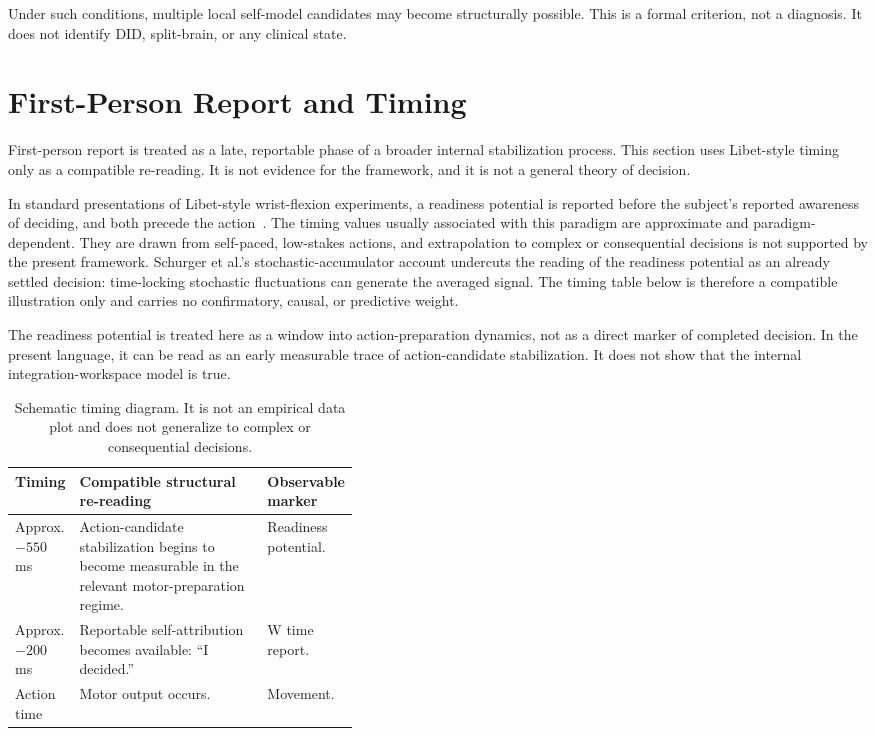\documentclass[12pt]{article}
\theoremstyle{definition}
\theoremstyle{remark}
\begin{document}
Under such conditions, multiple local self-model candidates may become
structurally possible. This is a formal criterion, not a diagnosis. It
does not identify DID, split-brain, or any clinical state.

\section{First-Person Report and Timing}

First-person report is treated as a late, reportable phase of a broader
internal stabilization process. This section uses Libet-style timing
only as a compatible re-reading. It is not evidence for the framework,
and it is not a general theory of decision.

In standard presentations of Libet-style wrist-flexion experiments, a
readiness potential is reported before the subject's reported awareness
of deciding, and both precede the action~\cite{Libet1983,Haggard2008,Schurger2012}. The timing values usually associated
with this paradigm are approximate and paradigm-dependent. They are
drawn from self-paced, low-stakes actions, and extrapolation to complex
or consequential decisions is not supported by the present framework.
Schurger et al.'s stochastic-accumulator account undercuts the reading of
the readiness potential as an already settled decision: time-locking
stochastic fluctuations can generate the averaged signal. The timing
table below is therefore a compatible illustration only and carries no
confirmatory, causal, or predictive weight.

The readiness potential is treated here as a window into
action-preparation dynamics, not as a direct marker of completed
decision. In the present language, it can be read as an early measurable
trace of action-candidate stabilization. It does not show that the
internal integration-workspace model is true.

\begin{table}[H]
\centering
\begin{tabularx}{0.95\linewidth}{P{0.18\linewidth}Y P{0.22\linewidth}}
\toprule
\textbf{Timing} & \textbf{Compatible structural re-reading} & \textbf{Observable marker} \\
\midrule
Approx. \(-550\) ms &
Action-candidate stabilization begins to become measurable in the relevant motor-preparation regime. &
Readiness potential. \\
Approx. \(-200\) ms &
Reportable self-attribution becomes available: ``I decided.'' &
W time report. \\
Action time &
Motor output occurs. &
Movement. \\
\bottomrule
\end{tabularx}
\caption{Schematic timing diagram. It is not an empirical data plot and
does not generalize to complex or consequential decisions.}
\end{table}
\end{document}
